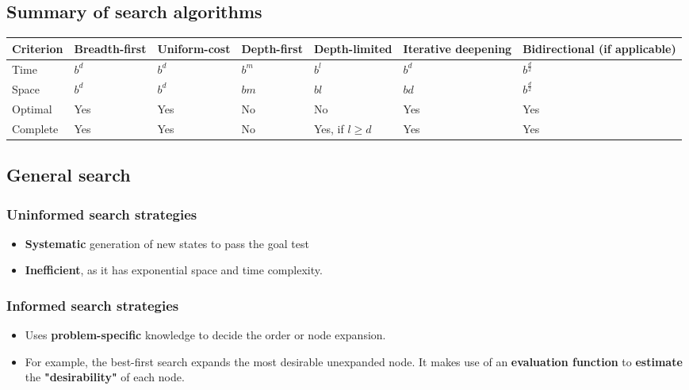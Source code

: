 \documentclass[11pt]{article}
\begin{document}
\subsection{Summary of search algorithms}
\label{sec:orgfa73d9d}
\begin{center}
\begin{tabular}{|m{5em}|m{4em}|m{4em}|m{4em}|m{4em}|m{5em}|m{6em}|}
\hline
Criterion & Breadth-first & Uniform-cost & Depth-first & Depth-limited & Iterative deepening & Bidirectional (if applicable)\\
\hline
Time & \(b^d\) & \(b^d\) & \(b^m\) & \(b^l\) & \(b^d\) & \(b^{\frac{d}{2}}\)\\
\hline
Space & \(b^d\) & \(b^d\) & \(bm\) & \(bl\) & \(bd\) & \(b^{\frac{d}{2}}\)\\
\hline
Optimal & Yes & Yes & No & No & Yes & Yes\\
\hline
Complete & Yes & Yes & No & Yes, if \(l \ge d\) & Yes & Yes\\
\hline
\end{tabular}
\end{center}

 \newpage
\subsection{General search}
\label{sec:orgde1fe6d}

\subsubsection{Uninformed search strategies}
\label{sec:org35a55b7}
\begin{itemize}
\item \textbf{Systematic} generation of new states to pass the goal test
\item \textbf{Inefficient}, as it has exponential space and time complexity.
\end{itemize}
\subsubsection{Informed search strategies}
\label{sec:org8ed227c}
\begin{itemize}
\item Uses \textbf{problem-specific} knowledge to decide the order or node expansion.
\item For example, the best-first search expands the most desirable unexpanded node.
It makes use of an \textbf{evaluation function} to \textbf{estimate} the \textbf{"desirability"} of each node.
\end{itemize}
\end{document}

